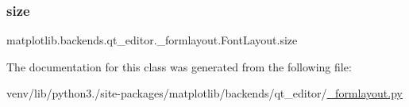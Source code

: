 \subsubsection{\texorpdfstring{size}{size}}
{\footnotesize\ttfamily matplotlib.\+backends.\+qt\+\_\+editor.\+\_\+formlayout.\+Font\+Layout.\+size}



The documentation for this class was generated from the following file\+:\begin{DoxyCompactItemize}
\item 
venv/lib/python3./site-\/packages/matplotlib/backends/qt\+\_\+editor/\hyperlink{__formlayout_8py}{\+\_\+formlayout.\+py}\end{DoxyCompactItemize}
